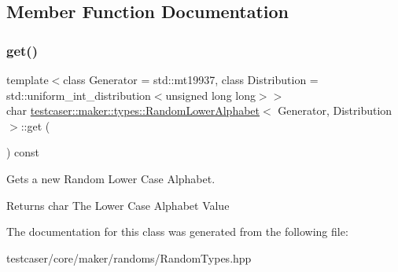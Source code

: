 \subsection{Member Function Documentation}
\mbox{\label{classtestcaser_1_1maker_1_1types_1_1RandomLowerAlphabet_a483c6ff333747eec0d212c1293aa5d59}} 
\subsubsection{\texorpdfstring{get()}{get()}}
{\footnotesize\ttfamily template$<$class Generator = std\+::mt19937, class Distribution = std\+::uniform\+\_\+int\+\_\+distribution$<$unsigned long long$>$$>$ \\
char \hyperlink{classtestcaser_1_1maker_1_1types_1_1RandomLowerAlphabet}{testcaser\+::maker\+::types\+::\+Random\+Lower\+Alphabet}$<$ Generator, Distribution $>$\+::get (\begin{DoxyParamCaption}{ }\end{DoxyParamCaption}) const\hspace{0.3cm}{\ttfamily [inline]}}



Gets a new Random Lower Case Alphabet. 

\begin{DoxyReturn}{Returns}
char The Lower Case Alphabet Value 
\end{DoxyReturn}


The documentation for this class was generated from the following file\+:\begin{DoxyCompactItemize}
\item 
testcaser/core/maker/randoms/Random\+Types.\+hpp\end{DoxyCompactItemize}
